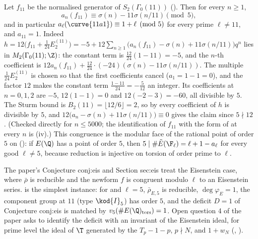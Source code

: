\begin{example}\label{ex:modforms:eisenstein-congruence}
Let $f_{11}$ be the normalised generator of $S_2(\Gamma_0(11))$ (). Then for every $n\ge1$,
\[
a_n(f_{11})\equiv\sigma(n)-11\sigma(n/11)\pmod5,
\]
and in particular $a_\ell(\curve{11a1})\equiv1+\ell\pmod5$ for every prime $\ell\ne11$, and $a_{11}=1$. Indeed
$h=12\bigl(f_{11}+\frac1{24}E_2^{(11)}\bigr)=-5+12\sum_{n\ge1}\bigl(a_n(f_{11})-\sigma(n)+11\sigma(n/11)\bigr)q^n$ lies in $M_2(\Gamma_0(11);\Z)$: the constant term is
$\frac{12}{24}(1-11)=-5$, and the $n$-th coefficient is $12a_n(f_{11})+\frac{12}{24}\cdot(-24)(\sigma(n)-11\sigma(n/11))$. The multiple $\frac1{24}E_2^{(11)}$ is chosen so that
the first coefficients cancel ($a_1=1-1=0$), and the factor $12$ makes the constant term $\frac{1-11}{24}=-\frac5{12}$ an integer. Its coefficients at $n=0,1,2$ are $-5$,
$12(1-1)=0$ and $12(-2-3)=-60$, all divisible by $5$. The Sturm bound is $B_2(11)=\lfloor12/6\rfloor=2$, so by  every coefficient of $h$ is divisible by $5$, and
$12\bigl(a_n-\sigma(n)+11\sigma(n/11)\bigr)\equiv0$ gives the claim since $5\nmid12$. (Checked directly for $n\le5000$; the identification of $f_{11}$ with the form of  at
every $n$ is (iv).) This congruence is the modular face of the rational point of order $5$ on  (): if
$E(\Q)$ has a point of order $5$, then $5\mid\#\tilde E(\F_\ell)=\ell+1-a_\ell$ for every good $\ell\ne5$, because reduction is injective on torsion of order prime to $\ell$.
\end{example}

\begin{paperlink}\label{pl:modforms:eisenstein}
The paper's Conjecture conj:eis and Section sec:eis treat the Eisenstein case, where $\bar\rho$ is reducible and the newform $f$ is congruent modulo $\ell$ to an Eisenstein series.
 is the simplest instance: for  and $\ell=5$, $\bar\rho_{E,5}$ is reducible, $\deg\varphi_E=1$, the component group at $11$ (type
$\kod{I}_5$) has order $5$, and the deficit $D=1$ of Conjecture conj:eis is matched by $v_5(\#E(\Q)_{\mathrm{tors}})=1$. Open question 4 of the paper asks to identify the
deficit with an invariant of the Eisenstein ideal, for prime level the ideal of $\T$ generated by the $T_p-1-p$, $p\nmid N$, and $1+w_N$ (\cite{Mazur77}, ).
\end{paperlink}

